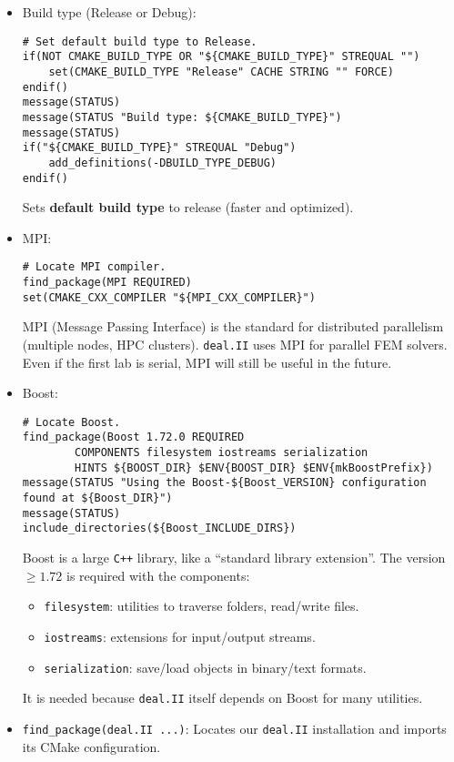 \begin{itemize}
    \item Build type (Release or Debug):
    \begin{lstlisting}
# Set default build type to Release.
if(NOT CMAKE_BUILD_TYPE OR "${CMAKE_BUILD_TYPE}" STREQUAL "")
    set(CMAKE_BUILD_TYPE "Release" CACHE STRING "" FORCE)
endif()
message(STATUS)
message(STATUS "Build type: ${CMAKE_BUILD_TYPE}")
message(STATUS)
if("${CMAKE_BUILD_TYPE}" STREQUAL "Debug")
    add_definitions(-DBUILD_TYPE_DEBUG)
endif()\end{lstlisting}
    Sets \textbf{default build type} to release (faster and optimized).


    \item MPI:
    \begin{lstlisting}
# Locate MPI compiler.
find_package(MPI REQUIRED)
set(CMAKE_CXX_COMPILER "${MPI_CXX_COMPILER}")\end{lstlisting}
    MPI (Message Passing Interface) is the standard for distributed parallelism (multiple nodes, HPC clusters). \texttt{deal.II} uses MPI for parallel FEM solvers. Even if the first lab is serial, MPI will still be useful in the future.


    \item Boost:
    \begin{lstlisting}
# Locate Boost.
find_package(Boost 1.72.0 REQUIRED
        COMPONENTS filesystem iostreams serialization
        HINTS ${BOOST_DIR} $ENV{BOOST_DIR} $ENV{mkBoostPrefix})
message(STATUS "Using the Boost-${Boost_VERSION} configuration found at ${Boost_DIR}")
message(STATUS)
include_directories(${Boost_INCLUDE_DIRS})\end{lstlisting}
    Boost is a large \texttt{C++} library, like a ``standard library extension''. The version $\ge1.72$ is required with the components:
    \begin{itemize}
        \item \texttt{filesystem}: utilities to traverse folders, read/write files.
        \item \texttt{iostreams}: extensions for input/output streams.
        \item \texttt{serialization}: save/load objects in binary/text formats.
    \end{itemize}
    It is needed because \texttt{deal.II} itself depends on Boost for many utilities.
    
    
    \item \texttt{find\_package(deal.II ...)}: Locates our \texttt{deal.II} installation and imports its CMake configuration.
    

\end{itemize}
